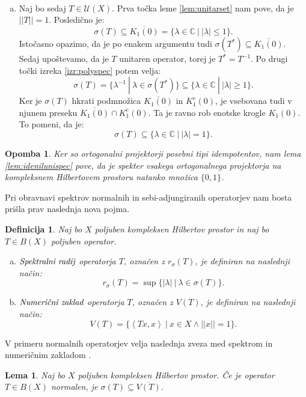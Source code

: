 \documentclass[12pt,a4paper,oneside,fleqn,openany]{book}
\newtheorem{lema}[izrek]{Lema}
\newtheorem{definicija}[izrek]{Definicija}
\newtheorem{opomba}[izrek]{Opomba}
\newcommand{\eopf}{\raisebox{0.8ex}{\framebox{}}} %
\newenvironment{dokaz}%
{\noindent{\bf Dokaz.}\ }%
{\hfill\eopf\par\bigskip}%
\newcommand{\C}{\mathbb{C}}
\newcommand{\abs}[1]{\ensuremath{\lvert #1 \rvert}}
\newcommand{\norm}[1]{\abs{\abs{#1}}}
\newcommand{\pojem}[1]{\ensuremath{\emph{#1}}}
\newcommand{\Sp}[2]{\ensuremath{\left<#1, #2\right>}}
\begin{document}
\begin{dokaz}
\begin{enumerate}[a)]
		\item Naj bo sedaj $T\in \mathcal{U}(X)$. Prva točka leme \ref{lem:unitarset} nam pove, da je $\norm{T}=1$. Posledično je: $$\sigma(T)\subseteq \overline{K_1(0)} = \{\lambda\in\C~|~\abs{\lambda}\leq 1\}.$$ Istočasno opazimo, da je po enakem argumentu tudi $\sigma(T^*) \subseteq \overline{K_1(0)}$. Sedaj upoštevamo, da je $T$ unitaren operator, torej je $T^* = T^{-1}$. Po drugi točki izreka \ref{izr:polyspec} potem velja: $$\sigma(T) =
		\{\lambda^{-1}~|~\lambda\in\sigma(T^*)\}\subseteq \{\lambda\in\C~|~\abs{\lambda}\geq 1\}.$$ Ker je $\sigma(T)$ hkrati podmnožica $\overline{K_1(0)}$ in $K_1^c(0)$, je vsebovana tudi v njunem preseku $\overline{K_1(0)}\cap K_1^c(0)$. Ta je ravno rob enotske krogle $K_1(0)$. To pomeni, da je: $$\sigma(T)\subseteq\{\lambda\in\C~|~\abs{\lambda}=1\}.$$
	\end{enumerate}
\end{dokaz}

\begin{opomba}
	\label{opomb:ortprojspec}
	Ker so ortogonalni projektorji posebni tipi idempotentov, nam lema \ref{lem:idenilunispec} pove, da je spekter vsakega ortogonalnega projektorja na kompleksnem Hilbertovem prostoru natanko množica $\{0, 1\}$.
\end{opomba}

Pri obravnavi spektrov normalnih in sebi-adjungiranih operatorjev nam bosta prišla prav naslednja nova pojma.

\begin{definicija}
	\label{def:specrad}
	Naj bo $X$ poljuben kompleksen Hilbertov prostor in naj bo $T\in B(X)$ poljuben operator. \begin{enumerate}[a)]
		\item \pojem{Spektralni radij} operatorja $T$, označen z $r_\sigma(T)$, je definiran na naslednji način: $$r_\sigma(T) = \sup\{\abs{\lambda}~|~\lambda\in\sigma(T)\}.$$
		\item \pojem{Numerični zaklad} operatorja $T$, označen z $V(T)$, je definiran na naslednji način: $$V(T)=\{\Sp{Tx}{x}~|~x\in X \land \norm{x}=1\}.$$
	\end{enumerate}
\end{definicija}

V primeru normalnih operatorjev velja naslednja zveza med spektrom in numeričnim zakladom .

\begin{lema}
	\label{lem:normalnumrazspec}
	Naj bo $X$ poljuben kompleksen Hilbertov prostor. Če je operator $T\in B(X)$ normalen, je $\sigma(T)\subseteq \overline{V(T)}$.
\end{lema}
\end{document}
